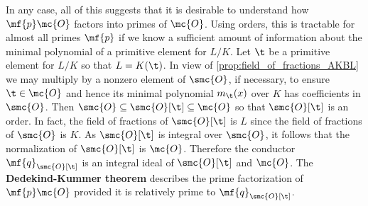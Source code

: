 \documentclass[12pt]{article}
\begin{document}
      In any case, all of this suggests that it is desirable to understand how \(\mf{p}\mc{O}\) factors into primes of \(\mc{O}\). Using orders, this is tractable for almost all primes \(\mf{p}\) if we know a sufficient amount of information about the minimal polynomial of a primitive element for \(L/K\). Let \(\t\) be a primitive element for \(L/K\) so that \(L = K(\t)\). In view of \cref{prop:field_of_fractions_AKBL} we may multiply by a nonzero element of \(\smc{O}\), if necessary, to ensure \(\t \in \mc{O}\) and hence its minimal polynomial \(m_{\t}(x)\) over \(K\) has coefficients in \(\smc{O}\). Then \(\smc{O} \subseteq \smc{O}[\t] \subseteq \mc{O}\) so that \(\smc{O}[\t]\) is an order. In fact, the field of fractions of \(\smc{O}[\t]\) is \(L\) since the field of fractions of \(\smc{O}\) is \(K\). As \(\smc{O}[\t]\) is integral over \(\smc{O}\), it follows that the normalization of \(\smc{O}[\t]\) is \(\mc{O}\). Therefore the conductor \(\mf{q}_{\smc{O}[\t]}\) is an integral ideal of \(\smc{O}[\t]\) and \(\mc{O}\). The \textbf{Dedekind-Kummer theorem} describes the prime factorization of \(\mf{p}\mc{O}\) provided it is relatively prime to \(\mf{q}_{\smc{O}[\t]}\).
\end{document}
